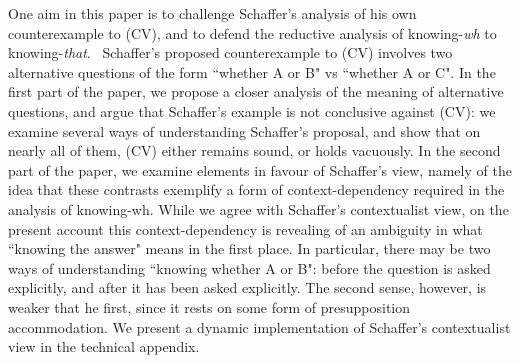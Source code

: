 One aim in this paper is to challenge Schaffer's analysis of his
own counterexample to (CV), and to defend the reductive analysis
of knowing-\emph{wh} to knowing-\emph{that}.
\ Schaffer's proposed counterexample to (CV) involves two
alternative questions of the form ``whether A or B" vs ``whether A
or C". In the first part of the paper, we propose a closer
analysis of the meaning of alternative questions, and argue that
Schaffer's example is not conclusive against (CV): we examine
several ways of understanding Schaffer's proposal, and show that
on nearly all of them, (CV) either remains sound, or holds
vacuously. In the second part of the paper, we examine elements in
favour of Schaffer's view, namely of the idea that these contrasts
exemplify a form of context-dependency required in the analysis of
knowing-wh. While we agree with Schaffer's contextualist view, on
the present account this context-dependency is revealing of an
ambiguity in what ``knowing the answer" means in the first place.
In particular, there may be two ways of understanding ``knowing
whether A or B": before the question is asked explicitly, and
after it has been asked explicitly. The second sense, however, is
weaker that he first, since it rests on some form of
presupposition accommodation. We present a dynamic implementation
of Schaffer's contextualist view in the technical appendix.
